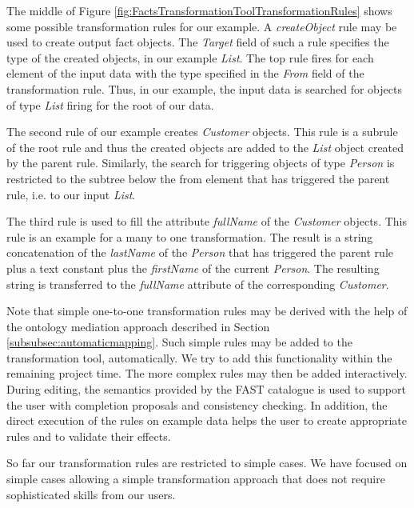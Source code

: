 The middle of Figure \ref{fig:FactsTransformationToolTransformationRules} shows some possible transformation rules for our example. A \textit{createObject} rule may be used to create output fact objects. The \textit{Target} field of such a rule specifies the type of the created objects, in our example \textit{List}. The top rule fires for each element of the input data with the type specified in the \textit{From} field of the transformation rule. Thus, in our example, the input data is searched for objects of type \textit{List} firing for the root of our data. 

The second rule of our example creates \textit{Customer} objects. This rule is a subrule of the root rule and thus the created objects are added to the \textit{List} object created by the parent rule. Similarly, the search for triggering objects of type \textit{Person} is restricted to the subtree below the from element that has triggered the parent rule, i.e. to our input \textit{List}. 

The third rule is used to fill the attribute \textit{fullName} of the \textit{Customer} objects. This rule is an example for a many to one transformation. The result is a string concatenation of the \textit{lastName} of the \textit{Person} that has triggered the parent rule plus a text constant plus the \textit{firstName} of the current \textit{Person}. The resulting string is transferred to the \textit{fullName} attribute of the corresponding \textit{Customer}. 

Note that simple one-to-one transformation rules may be derived with the help of the ontology mediation approach described in Section \ref{subsubsec:automaticmapping}. Such simple rules may be added to the transformation tool, automatically. We try to add this functionality within the remaining project time. The more complex rules may then be added interactively. During editing, the semantics provided by the FAST catalogue is used to support the user with completion proposals and consistency checking. In addition, the direct execution of the rules on example data helps the user to create appropriate rules and to validate their effects. 

So far our transformation rules are restricted to simple cases. We have focused on simple cases allowing a simple transformation approach that does not require sophisticated skills from our users. 

